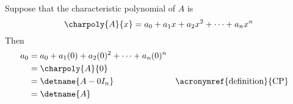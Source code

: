 Suppose that the characteristic polynomial of $A$ is
%
\begin{equation*}
\charpoly{A}{x}=a_0+a_1x+a_2x^2+\dots+a_nx^n
\end{equation*}
%
Then
%
\begin{align*}
a_0
&=a_0+a_1(0)+a_2(0)^2+\dots+a_n(0)^n\\
%
&=\charpoly{A}{0}\\
%
&=\detname{A-0I_n}
&&\text{\acronymref{definition}{CP}}\\
%
&=\detname{A}
%
\end{align*}
